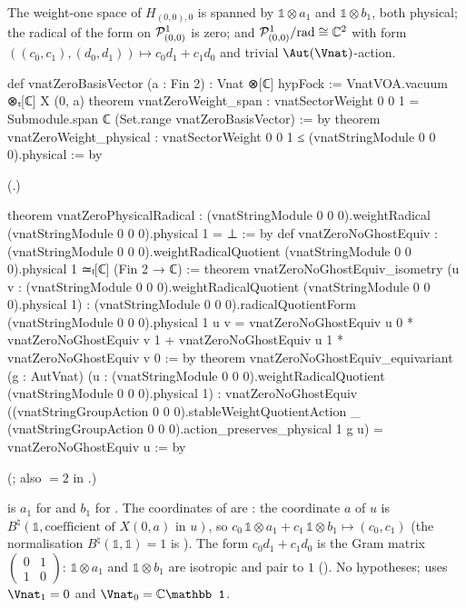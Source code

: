 \begin{theorem}\label{ch18:thm:zeromomentum}
The weight-one space of $H_{(0,0),0}$ is spanned by $\mathbb 1\otimes a_1$ and $\mathbb 1\otimes b_1$, both physical; the radical of
the form on $\mathcal{P}^1_{(0,0)}$ is zero; and $\mathcal{P}^1_{(0,0)}/\mathrm{rad}\cong\mathbb C^2$ with form
$((c_0,c_1),(d_0,d_1))\mapsto c_0d_1+c_1d_0$ and trivial $\Aut(\Vnat)$-action.
\end{theorem}
\begin{leancode}
def vnatZeroBasisVector (a : Fin 2) : Vnat ⊗[ℂ] hypFock :=
  VnatVOA.vacuum ⊗ₜ[ℂ] X (0, a)
theorem vnatZeroWeight_span :
    vnatSectorWeight 0 0 1 = Submodule.span ℂ (Set.range vnatZeroBasisVector) := by
theorem vnatZeroWeight_physical :
    vnatSectorWeight 0 0 1 ≤ (vnatStringModule 0 0 0).physical := by
\end{leancode}
(.)
\begin{leancode}
theorem vnatZeroPhysicalRadical :
    (vnatStringModule 0 0 0).weightRadical (vnatStringModule 0 0 0).physical 1 = ⊥ := by
def vnatZeroNoGhostEquiv :
    (vnatStringModule 0 0 0).weightRadicalQuotient (vnatStringModule 0 0 0).physical 1 ≃ₗ[ℂ]
      (Fin 2 → ℂ) :=
theorem vnatZeroNoGhostEquiv_isometry
    (u v : (vnatStringModule 0 0 0).weightRadicalQuotient (vnatStringModule 0 0 0).physical 1) :
    (vnatStringModule 0 0 0).radicalQuotientForm (vnatStringModule 0 0 0).physical 1 u v =
      vnatZeroNoGhostEquiv u 0 * vnatZeroNoGhostEquiv v 1 +
        vnatZeroNoGhostEquiv u 1 * vnatZeroNoGhostEquiv v 0 := by
theorem vnatZeroNoGhostEquiv_equivariant (g : AutVnat)
    (u : (vnatStringModule 0 0 0).weightRadicalQuotient (vnatStringModule 0 0 0).physical 1) :
    vnatZeroNoGhostEquiv
      ((vnatStringGroupAction 0 0 0).stableWeightQuotientAction _
        (vnatStringGroupAction 0 0 0).action_preserves_physical 1 g u) =
      vnatZeroNoGhostEquiv u := by
\end{leancode}
(; also  $=2$ in
.)
\begin{dictionary}
 is $a_1$ for  and $b_1$ for .  The coordinates of
 are : the coordinate $a$ of $u$ is
$B^\natural(\mathbb 1,\text{coefficient of }X(0,a)\text{ in }u)$, so $c_0\,\mathbb 1\otimes a_1+c_1\,\mathbb 1\otimes b_1\mapsto(c_0,c_1)$ (the
normalisation $B^\natural(\mathbb 1,\mathbb 1)=1$ is ).  The form $c_0d_1+c_1d_0$ is the Gram
matrix $\left(\begin{smallmatrix}0&1\\1&0\end{smallmatrix}\right)$: $\mathbb 1\otimes a_1$ and $\mathbb 1\otimes b_1$ are isotropic and pair to
$1$ ().  No hypotheses; uses $\Vnat_1=0$ and $\Vnat_0=\mathbb C\mathbb 1$.
\end{dictionary}
